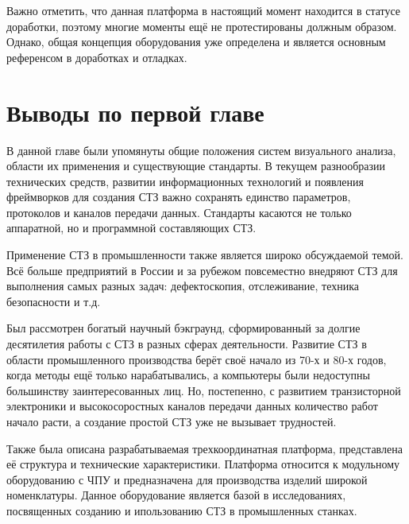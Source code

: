 Важно отметить, что данная платформа в настоящий момент находится в статусе доработки, поэтому многие моменты ещё не протестированы должным образом. Однако, общая концепция оборудования уже определена и является основным референсом в доработках и отладках.

\section{Выводы по первой главе} \label{sect1_6}

В данной главе были упомянуты общие положения систем визуального анализа, области их применения и существующие стандарты. В текущем разнообразии технических средств, развитии информационных технологий и появления фреймворков для создания СТЗ важно сохранять единство параметров, протоколов и каналов передачи данных. Стандарты касаются не только аппаратной, но и программной составляющих СТЗ.

Применение СТЗ в промышленности также является широко обсуждаемой темой. Всё больше предприятий в России и за рубежом повсеместно внедряют СТЗ для выполнения самых разных задач: дефектоскопия, отслеживание, техника безопасности и т.д.

Был рассмотрен богатый научный бэкграунд, сформированный за долгие десятилетия работы с СТЗ в разных сферах деятельности. Развитие СТЗ в области промышленного производства берёт своё начало из 70-х и 80-х годов, когда методы ещё только нарабатывались, а компьютеры были недоступны большинству заинтересованных лиц. Но, постепенно, с развитием транзисторной электроники и высокосоростных каналов передачи данных количество работ начало расти, а создание простой СТЗ уже не вызывает трудностей.

Также была описана разрабатываемая трехкоординатная платформа, представлена её структура и технические характеристики. Платформа относится к модульному оборудованию с ЧПУ и предназначена для производства изделий широкой номенклатуры. Данное оборудование является базой в исследованиях, посвященных созданию и ипользованию СТЗ в промышленных станках.